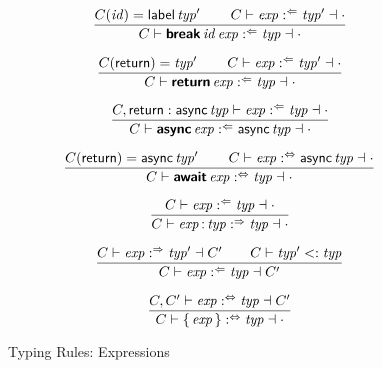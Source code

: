\begin{figure*}
$$
\frac{
  C(\x{id}) = \K{label} \x{typ}'
  \qquad
  C \vdash \x{exp} \anal \x{typ}' \dashv \cdot
}{
  C \vdash \KK{break} \x{id} \x{exp} \anal \x{typ} \dashv \cdot
}
$$

$$
\frac{
  C(\K{return}) = \x{typ}'
  \qquad
  C \vdash \x{exp} \anal \x{typ}' \dashv \cdot
}{
  C \vdash \KK{return} \x{exp} \anal \x{typ} \dashv \cdot
}
$$

$$
\frac{
  C, \K{return} : \K{async} \x{typ} \vdash \x{exp} \anal \x{typ} \dashv \cdot
}{
  C \vdash \KK{async} \x{exp} \anal \K{async} \x{typ} \dashv \cdot
}
$$

$$
\frac{
  C(\K{return}) = \K{async} \x{typ}'
  \qquad
  C \vdash \x{exp} \analsynth \K{async} \x{typ} \dashv \cdot
}{
  C \vdash \KK{await} \x{exp} \analsynth \x{typ} \dashv \cdot
}
$$

$$
\frac{
  C \vdash \x{exp} \anal \x{typ} \dashv \cdot
}{
  C \vdash \x{exp} \K: \x{typ} \synth \x{typ} \dashv \cdot
}
$$

$$
\frac{
  C \vdash \x{exp} \synth \x{typ}' \dashv C'
  \qquad
  C \vdash \x{typ}' <: \x{typ}
}{
  C \vdash \x{exp} \anal \x{typ} \dashv C'
}
$$

$$
\frac{
  C, C' \vdash \x{exp} \analsynth \x{typ} \dashv C'
}{
  C \vdash \K\{ \x{exp} \K\} \analsynth \x{typ} \dashv \cdot
}
$$


\caption{Typing Rules: Expressions}
\label{fig:typing.exp}

\end{figure*}


